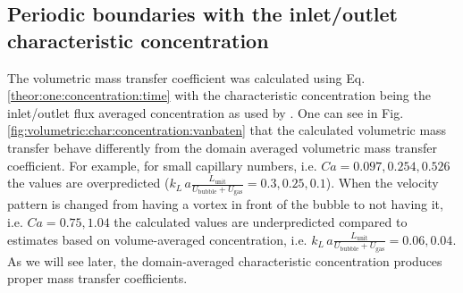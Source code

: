 \documentclass{article}
\newcommand{\vol}{k_L\,a}
\newcommand{\lunit}{L_{\mathrm{unit}}}
\newcommand{\ububble}{U_{\mathrm{bubble}}}
\newcommand{\ugas}{U_{\mathrm{gas}}}
\newcommand{\volnondim}{\vol \frac{\lunit}{\ububble+\ugas}}
\begin{document}
\subsection{Periodic boundaries with the inlet/outlet characteristic concentration}
\label{results:periodic:inlet:outlet} 
The volumetric mass transfer coefficient
was calculated using Eq. \ref{theor:one:concentration:time} with the
characteristic concentration being the inlet/outlet flux averaged concentration
as used by \citet{vanbaten-circular}. One can see in Fig.
\ref{fig:volumetric:char:concentration:vanbaten} that the calculated volumetric mass
transfer behave differently from the domain averaged  volumetric mass
transfer coefficient. For example, for small capillary numbers, i.e.
$Ca=0.097,0.254,0.526$ the values are overpredicted
($\volnondim=0.3,0.25,0.1$). When the velocity pattern is changed from having
a vortex in front of
the bubble to not having it,  i.e. $Ca=0.75,1.04$ the calculated values
are underpredicted compared to estimates based on volume-averaged concentration, i.e. $\volnondim=0.06,0.04$. As we will see later, the domain-averaged characteristic concentration produces proper mass transfer coefficients. 
\end{document}
